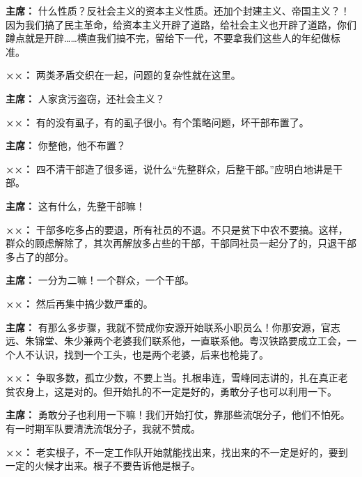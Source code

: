 \begin{duihua}
\item[\textbf{主席：}] 什么性质？反社会主义的资本主义性质。还加个封建主义、帝国主义？！因为我们搞了民主革命，给资本主义开辟了道路，给社会主义也开辟了道路，你们蹲点就是开辟……横直我们搞不完，留给下一代，不要拿我们这些人的年纪做标准。

\item[\textbf{××：}] 两类矛盾交织在一起，问题的复杂性就在这里。

\item[\textbf{主席：}] 人家贪污盗窃，还社会主义？

\item[\textbf{××：}] 有的没有虱子，有的虱子很小。有个策略问题，坏干部布置了。

\item[\textbf{主席：}] 你整他，他不布置？

\item[\textbf{××：}] 四不清干部造了很多谣，说什么“先整群众，后整干部。”应明白地讲是干部。

\item[\textbf{主席：}] 这有什么，先整干部嘛！

\item[\textbf{××：}] 干部多吃多占的要退，所有社员的不退。不只是贫下中农不要搞。这样，群众的顾虑解除了，其次再解放多占些的干部，干部同社员一起分了的，只退干部多占了的部分。

\item[\textbf{主席：}] 一分为二嘛！一个群众，一个干部。

\item[\textbf{××：}] 然后再集中搞少数严重的。

\item[\textbf{主席：}] 有那么多步骤，我就不赞成你安源开始联系小职员么！你那安源，官志远、朱锦堂、朱少兼两个老婆我们联系他，一直联系他。粤汉铁路要成立工会，一个人不认识，找到一个工头，也是两个老婆，后来也枪毙了。

\item[\textbf{××：}] 争取多数，孤立少数，不要上当。扎根串连，雪峰同志讲的，扎在真正老贫农身上，这是对的。但开始扎的不一定是好的，勇敢分子也可以利用一下。

\item[\textbf{主席：}] 勇敢分子也利用一下嘛！我们开始打仗，靠那些流氓分子，他们不怕死。有一时期军队要清洗流氓分子，我就不赞成。

\item[\textbf{××：}] 老实根子，不一定工作队开始就能找出来，找出来的不一定是好的，要到一定的火候才出来。根子不要告诉他是根子。


\end{duihua}
